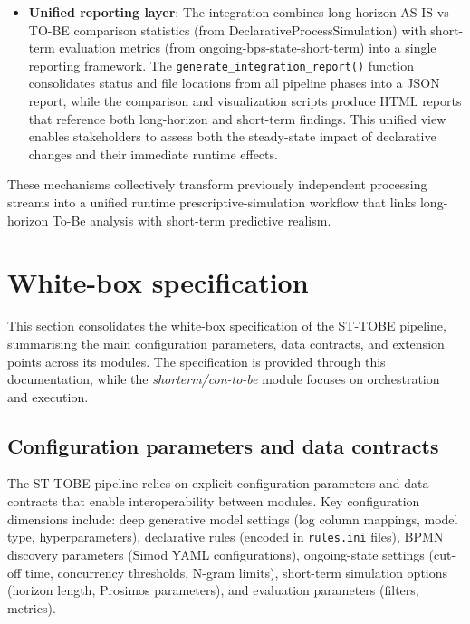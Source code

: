 \documentclass[a4paper,fleqn]{cas-sc}
\begin{document}
\begin{itemize}
  \item \textbf{Unified reporting layer}: The integration combines long-horizon AS-IS vs TO-BE
  comparison statistics (from DeclarativeProcessSimulation) with short-term evaluation metrics
  (from ongoing-bps-state-short-term) into a single reporting framework. The \verb|generate_integration_report()|
  function consolidates status and file locations from all pipeline phases into a JSON report,
  while the comparison and visualization scripts produce HTML reports that reference both long-horizon
  and short-term findings. This unified view enables stakeholders to assess both the steady-state
  impact of declarative changes and their immediate runtime effects.
\end{itemize}

These mechanisms collectively transform previously independent processing streams into a unified
runtime prescriptive-simulation workflow that links long-horizon To-Be analysis with short-term
predictive realism.

\section{White-box specification}
\label{sec:whitebox}

This section consolidates the white-box specification of the ST-TOBE
pipeline, summarising the main
configuration parameters, data contracts, and extension points
across its modules.
The specification is provided through this documentation, while
the \emph{shorterm/con-to-be} module focuses on orchestration and
execution.

\subsection{Configuration parameters and data contracts}

The ST-TOBE pipeline relies on explicit configuration parameters
and data contracts that enable interoperability between modules.
Key configuration dimensions include: deep generative model settings
(log column mappings, model type, hyperparameters), declarative rules
(encoded in \verb|rules.ini| files), BPMN discovery parameters (Simod
YAML configurations), ongoing-state settings (cut-off time, concurrency
thresholds, N-gram limits), short-term simulation options (horizon
length, Prosimos parameters), and evaluation parameters (filters,
metrics).
\end{document}
